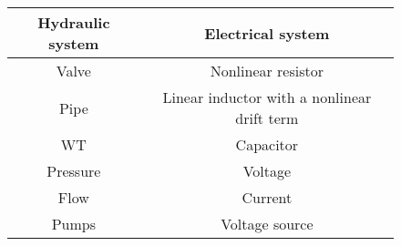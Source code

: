 \begin{figure}[H]
	\centering
\begin{tabular}{c|c} 
  			\bfseries Hydraulic system    &     \bfseries Electrical system  \\ \hline
			Valve		  	  &     Nonlinear resistor   \\ 
			Pipe              &     Linear inductor with a nonlinear drift term       \\ 
			WT 		          &     Capacitor       \\
			Pressure	 	  &     Voltage    \\
			Flow 		      &     Current       \\  
			Pumps 		      &     Voltage source           
\end{tabular}
		\label{tab:hydraulic_electrical}

\end{figure}	
	